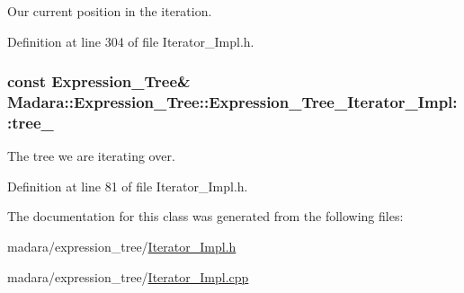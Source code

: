 Our current position in the iteration. 



Definition at line 304 of file Iterator\_\-Impl.h.

\hypertarget{classMadara_1_1Expression__Tree_1_1Expression__Tree__Iterator__Impl_a4b369e3fcfc62405321ece1d46719f93}{
\subsubsection[{tree\_\-}]{\setlength{\rightskip}{0pt plus 5cm}const {\bf Expression\_\-Tree}\& {\bf Madara::Expression\_\-Tree::Expression\_\-Tree\_\-Iterator\_\-Impl::tree\_\-}}}
\label{d0/dd7/classMadara_1_1Expression__Tree_1_1Expression__Tree__Iterator__Impl_a4b369e3fcfc62405321ece1d46719f93}


The tree we are iterating over. 



Definition at line 81 of file Iterator\_\-Impl.h.



The documentation for this class was generated from the following files:\begin{DoxyCompactItemize}
\item 
madara/expression\_\-tree/\hyperlink{Iterator__Impl_8h}{Iterator\_\-Impl.h}\item 
madara/expression\_\-tree/\hyperlink{Iterator__Impl_8cpp}{Iterator\_\-Impl.cpp}\end{DoxyCompactItemize}
